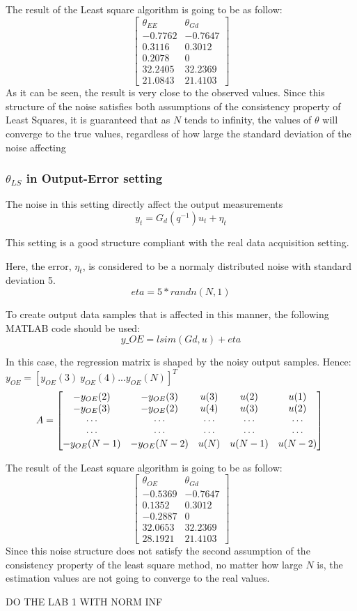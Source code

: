 The result of the Least square algorithm is going to be as follow:
\[
\begin{bmatrix}
    \theta_{EE} & \theta_{Gd} \\
    -0.7762 & -0.7647 \\
     0.3116 & 0.3012 \\
     0.2078 & 0 \\
    32.2405 & 32.2369 \\
    21.0843 & 21.4103
\end{bmatrix}
\]
As it can be seen, the result is very close to the observed values. Since this structure of the noise satisfies both assumptions of the consistency property of Least Squares, it is guaranteed that as \(N\) tends to infinity, the values of \(\theta\) will converge to the true values, regardless of how large the standard deviation of the noise affecting

\subsubsection{\(\theta_{LS}\) in Output-Error setting}
The noise in this setting directly affect the output measurements
\[
y_t = G_d(q^{-1})u_t + \eta_t
\]
\begin{QandAbox}
This setting is a good structure compliant with the real data acquisition setting.
\end{QandAbox}
Here, the error, \(\eta_t\), is considered to be a normaly distributed noise with standard deviation 5.
\[
eta = 5 * randn(N,1)
\]

To create output data samples that is affected in this manner, the following MATLAB code should be used:
\[
y\_OE = lsim(Gd,u) + eta
\]

In this case, the regression matrix is shaped by the noisy output samples. Hence:
\(y_{OE} = [y_{OE}(3) \: y_{OE}(4) ... y_{OE}(N)]^T 
\)
\[
    A = \left[
    \begin{matrix}
    -y_{OE}(2) & -y_{OE}(3) & u(3) & u(2) & u(1) \\
    -y_{OE}(3) & -y_{OE}(2) & u(4) & u(3) & u(2) \\
    \cdots & \cdots & \cdots & \cdots & \cdots   \\
    \cdots & \cdots & \cdots & \cdots & \cdots   \\
    -y_{OE}(N-1) & -y_{OE}(N-2) & u(N) & u(N-1) & u(N-2)
    \end{matrix} 
    \right]\\
\]

The result of the Least square algorithm is going to be as follow:
\[
\begin{bmatrix}
    \theta_{OE} & \theta_{Gd} \\
    -0.5369 & -0.7647 \\
     0.1352 & 0.3012 \\
    -0.2887 & 0 \\
    32.0653 & 32.2369 \\
    28.1921 & 21.4103
\end{bmatrix}
\]
Since this noise structure does not satisfy the second assumption of the consistency property of the least square method, no matter how large \(N\) is, the estimation values are not going to converge to the real values.

DO THE LAB 1 WITH NORM INF
